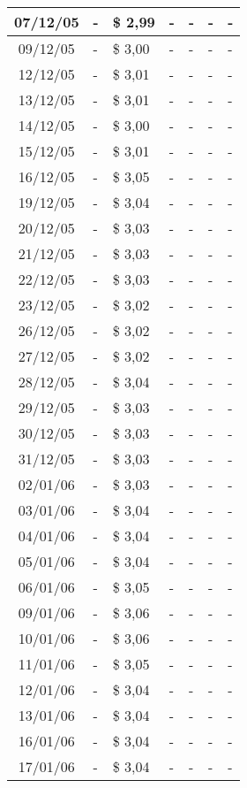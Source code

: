 \begin{center}
\begin{longtable}{|c|p{1.5cm}|p{1.5cm}|p{1.5cm}|p{1.5cm}|p{1.5cm}|p{1.5cm}|}
07/12/05 & - & \$ 2,99 & - & - & - & - \\ \hline
09/12/05 & - & \$ 3,00 & - & - & - & - \\ \hline
12/12/05 & - & \$ 3,01 & - & - & - & - \\ \hline
13/12/05 & - & \$ 3,01 & - & - & - & - \\ \hline
14/12/05 & - & \$ 3,00 & - & - & - & - \\ \hline
15/12/05 & - & \$ 3,01 & - & - & - & - \\ \hline
16/12/05 & - & \$ 3,05 & - & - & - & - \\ \hline
19/12/05 & - & \$ 3,04 & - & - & - & - \\ \hline
20/12/05 & - & \$ 3,03 & - & - & - & - \\ \hline
21/12/05 & - & \$ 3,03 & - & - & - & - \\ \hline
22/12/05 & - & \$ 3,03 & - & - & - & - \\ \hline
23/12/05 & - & \$ 3,02 & - & - & - & - \\ \hline
26/12/05 & - & \$ 3,02 & - & - & - & - \\ \hline
27/12/05 & - & \$ 3,02 & - & - & - & - \\ \hline
28/12/05 & - & \$ 3,04 & - & - & - & - \\ \hline
29/12/05 & - & \$ 3,03 & - & - & - & - \\ \hline
30/12/05 & - & \$ 3,03 & - & - & - & - \\ \hline
31/12/05 & - & \$ 3,03 & - & - & - & - \\ \hline
02/01/06 & - & \$ 3,03 & - & - & - & - \\ \hline
03/01/06 & - & \$ 3,04 & - & - & - & - \\ \hline
04/01/06 & - & \$ 3,04 & - & - & - & - \\ \hline
05/01/06 & - & \$ 3,04 & - & - & - & - \\ \hline
06/01/06 & - & \$ 3,05 & - & - & - & - \\ \hline
09/01/06 & - & \$ 3,06 & - & - & - & - \\ \hline
10/01/06 & - & \$ 3,06 & - & - & - & - \\ \hline
11/01/06 & - & \$ 3,05 & - & - & - & - \\ \hline
12/01/06 & - & \$ 3,04 & - & - & - & - \\ \hline
13/01/06 & - & \$ 3,04 & - & - & - & - \\ \hline
16/01/06 & - & \$ 3,04 & - & - & - & - \\ \hline
17/01/06 & - & \$ 3,04 & - & - & - & - \\ \hline

\end{longtable}
\end{center}
